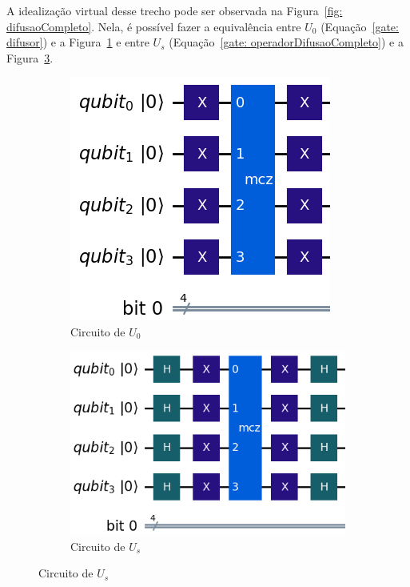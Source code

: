 A idealização virtual desse trecho pode ser observada na Figura~\ref{fig: difusaoCompleto}. Nela, é possível fazer a equivalência entre $U_0$ (Equação~\ref{gate: difusor}) e a Figura~\ref{subFig: Uo} e entre $U_s$ (Equação~\ref{gate: operadorDifusaoCompleto}) e a Figura~\ref{subFig: Us}.
%
\begin{figure}[ht!]
    \centering
    \captionsetup{justification=centering}
    \caption{Circuito Qu\^{a}ntico Virtual - Amplificação, $U_0$ e $U_s$.}
    \label{fig: difusaoCompleto}

    \begin{subfigure}[b]{0.25\textwidth}
        \centering
        \includegraphics[width=\linewidth]{Imagens/circuitoDifusor.png}
        \caption{Circuito de $U_0$}
        \label{subFig: Uo}
    \end{subfigure}
    \hspace{1cm}
    \begin{subfigure}[b]{0.35\textwidth}
        \centering
        \includegraphics[width=\linewidth]{Imagens/circuitoDifusorCompleto.png}
        \caption{Circuito de $U_s$}
        \label{subFig: Us}
    \end{subfigure}
    

\end{figure}
